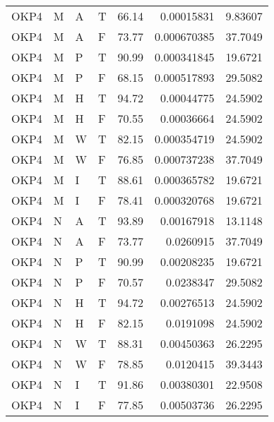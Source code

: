 \begin{tabular}{llllrrr}
    OKP4     & M     & A     & T          & 66.14      & 0.00015831  & 9.83607  \\
    OKP4     & M     & A     & F          & 73.77      & 0.000670385 & 37.7049  \\
    OKP4     & M     & P     & T          & 90.99      & 0.000341845 & 19.6721  \\
    OKP4     & M     & P     & F          & 68.15      & 0.000517893 & 29.5082  \\
    OKP4     & M     & H     & T          & 94.72      & 0.00044775  & 24.5902  \\
    OKP4     & M     & H     & F          & 70.55      & 0.00036664  & 24.5902  \\
    OKP4     & M     & W     & T          & 82.15      & 0.000354719 & 24.5902  \\
    OKP4     & M     & W     & F          & 76.85      & 0.000737238 & 37.7049  \\
    OKP4     & M     & I     & T          & 88.61      & 0.000365782 & 19.6721  \\
    OKP4     & M     & I     & F          & 78.41      & 0.000320768 & 19.6721  \\
    OKP4     & N     & A     & T          & 93.89      & 0.00167918  & 13.1148  \\
    OKP4     & N     & A     & F          & 73.77      & 0.0260915   & 37.7049  \\
    OKP4     & N     & P     & T          & 90.99      & 0.00208235  & 19.6721  \\
    OKP4     & N     & P     & F          & 70.57      & 0.0238347   & 29.5082  \\
    OKP4     & N     & H     & T          & 94.72      & 0.00276513  & 24.5902  \\
    OKP4     & N     & H     & F          & 82.15      & 0.0191098   & 24.5902  \\
    OKP4     & N     & W     & T          & 88.31      & 0.00450363  & 26.2295  \\
    OKP4     & N     & W     & F          & 78.85      & 0.0120415   & 39.3443  \\
    OKP4     & N     & I     & T          & 91.86      & 0.00380301  & 22.9508  \\
    OKP4     & N     & I     & F          & 77.85      & 0.00503736  & 26.2295  \\
    \hline
\end{tabular}